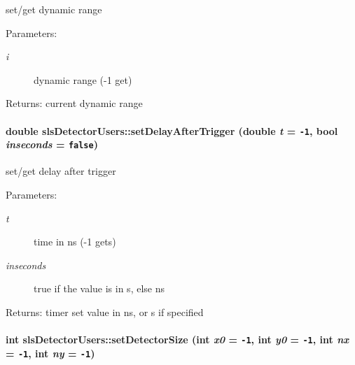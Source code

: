 set/get dynamic range 

\begin{Desc}
\item[Parameters:]
\begin{description}
\item[{\em i}]dynamic range (-1 get) \end{description}
\end{Desc}
\begin{Desc}
\item[Returns:]current dynamic range \end{Desc}
\hypertarget{classslsDetectorUsers_99f67fab7edfe68cc8b2300e282ff3f2}{
\paragraph[setDelayAfterTrigger]{\setlength{\rightskip}{0pt plus 5cm}double sls\-Detector\-Users::set\-Delay\-After\-Trigger (double {\em t} = {\tt -1}, bool {\em inseconds} = {\tt false})}\hfill}
\label{classslsDetectorUsers_99f67fab7edfe68cc8b2300e282ff3f2}


set/get delay after trigger 

\begin{Desc}
\item[Parameters:]
\begin{description}
\item[{\em t}]time in ns (-1 gets) \item[{\em inseconds}]true if the value is in s, else ns \end{description}
\end{Desc}
\begin{Desc}
\item[Returns:]timer set value in ns, or s if specified \end{Desc}
\hypertarget{classslsDetectorUsers_42c97d03516a2457f8e9a98a16a9a43d}{
\paragraph[setDetectorSize]{\setlength{\rightskip}{0pt plus 5cm}int sls\-Detector\-Users::set\-Detector\-Size (int {\em x0} = {\tt -1}, int {\em y0} = {\tt -1}, int {\em nx} = {\tt -1}, int {\em ny} = {\tt -1})}\hfill}
\label{classslsDetectorUsers_42c97d03516a2457f8e9a98a16a9a43d}


